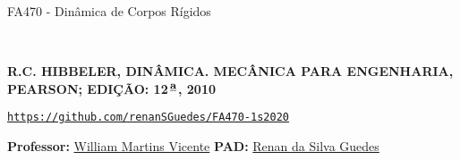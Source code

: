 \begin{center}
	\begin{huge}
		FA470 - Dinâmica de Corpos Rígidos
	\end{huge}\\\vspace{.3cm}
	\begin{large}
		\textbf{R.C. HIBBELER, DINÂMICA. MECÂNICA PARA ENGENHARIA, PEARSON; EDIÇÃO: 12$^{\,\textbf{\underline{\small{a}}}}$, 2010}
		
		\href{https://github.com/renanSGuedes/FA470-1s2020}{\texttt{https://github.com/renanSGuedes/FA470-1s2020}}\\\vspace{.15cm}
	\end{large}	
\end{center}

\hspace{.5cm}
\begin{large}
	\textbf{Professor:} \underline{William Martins Vicente}\hspace{.5cm}
	\large{\textbf{PAD: }\underline{Renan da Silva Guedes}}
\end{large}

\begin{center}
	\\\vspace{.2cm}
\end{center}
